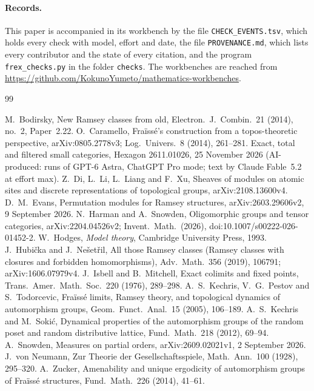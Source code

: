 \documentclass[11pt,a4paper]{article}
\theoremstyle{definition}
\begin{document}
\paragraph{Records.} This paper is accompanied in its workbench by the file
\texttt{CHECK\_EVENTS.tsv}, which holds every check with model, effort and
date, the file \texttt{PROVENANCE.md}, which lists every contributor and
the state of every citation, and the program \texttt{frex\_checks.py} in
the folder \texttt{checks}. The workbenches are reached from
\url{https://github.com/KokunoYumeto/mathematics-workbenches}.

\begin{thebibliography}{99}
\raggedright
{} M.~Bodirsky, New Ramsey classes from old, Electron.\ J.\
 Combin.\ 21 (2014), no.~2, Paper~2.22.
 O.~Caramello, Fra\"iss\'e's construction from a topos-theoretic
 perspective, arXiv:0805.2778v3; Log.\ Univers.\ 8 (2014), 261--281.
\bibitem{D1} Exact, total and filtered small categories, Hexagon
 2611.01026, 25 November 2026 (AI-produced: runs of GPT-6 Astra, ChatGPT
 Pro mode; text by Claude Fable~5.2 at effort max).
 Z.~Di, L.~Li, L.~Liang and F.~Xu, Sheaves of modules on
 atomic sites and discrete representations of topological groups,
 arXiv:2108.13600v4.
 D.~M.~Evans, Permutation modules for Ramsey structures,
 arXiv:2603.29606v2, 9 September 2026.
 N.~Harman and A.~Snowden, Oligomorphic groups and tensor
 categories, arXiv:2204.04526v2; Invent.\ Math.\ (2026),
 doi:10.1007/s00222-026-01452-2.
 W.~Hodges, \emph{Model theory}, Cambridge University Press,
 1993.
 J.~Hubi\v cka and J.~Ne\v set\v ril, All those Ramsey classes
 (Ramsey classes with closures and forbidden homomorphisms), Adv.\ Math.\
 356 (2019), 106791; arXiv:1606.07979v4.
\bibitem{IM} J.~Isbell and B.~Mitchell, Exact colimits and fixed points,
 Trans.\ Amer.\ Math.\ Soc.\ 220 (1976), 289--298.
\bibitem{KPT} A.~S.~Kechris, V.~G.~Pestov and S.~Todorcevic, Fra\"iss\'e
 limits, Ramsey theory, and topological dynamics of automorphism groups,
 Geom.\ Funct.\ Anal.\ 15 (2005), 106--189.
\bibitem{KS} A.~S.~Kechris and M.~Soki\'c, Dynamical properties of the
 automorphism groups of the random poset and random distributive lattice,
 Fund.\ Math.\ 218 (2012), 69--94.
\bibitem{Sn} A.~Snowden, Measures on partial orders, arXiv:2609.02021v1,
 2 September 2026.
\bibitem{vN} J.~von Neumann, Zur Theorie der Gesellschaftsspiele, Math.\
 Ann.\ 100 (1928), 295--320.
\bibitem{Zu} A.~Zucker, Amenability and unique ergodicity of automorphism
 groups of Fra\"iss\'e structures, Fund.\ Math.\ 226 (2014), 41--61.
\end{thebibliography}
\end{document}
